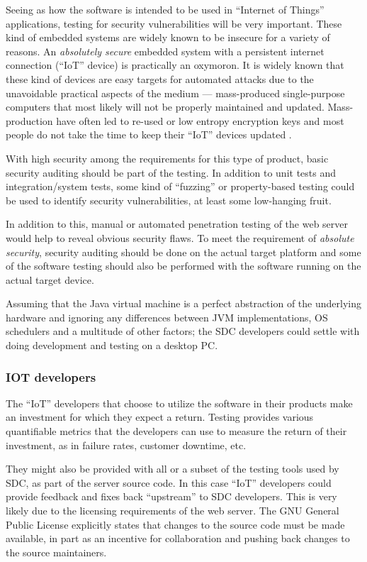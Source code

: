 Seeing as how the software is intended to be used in ``Internet of Things''
applications, testing for security vulnerabilities will be very important.
These kind of embedded systems are widely known to be insecure for a variety of
reasons. \cite{iot-malwarebytes}
An \emph{absolutely secure} embedded system with a persistent internet
connection (``IoT'' device) is practically an oxymoron. It is widely known that
these kind of devices are easy targets for automated attacks due to the
unavoidable practical aspects of the medium --- mass-produced single-purpose
computers that most likely will not be properly maintained and updated.
Mass-production have often led to re-used or low entropy encryption keys
\cite{iot-crypto-key-reuse} and most people do not take the time to keep their
``IoT'' devices updated \cite{iot-attack-waiting-to-happen}.

With high security among the requirements for this type of product, basic
security auditing should be part of the testing.
In addition to unit tests and integration/system tests, some kind of
``fuzzing'' or property-based testing \cite{hypothesis-testing} could be used
to identify security vulnerabilities, at least some low-hanging fruit.

In addition to this, manual or automated penetration testing of the web server
would help to reveal obvious security flaws.
To meet the requirement of \emph{absolute security}, security auditing should
be done on the actual target platform and some of the software testing should
also be performed with the software running on the actual target
device\cite{6006307}.

Assuming that the Java virtual machine is a perfect abstraction of the
underlying hardware and ignoring any differences between JVM implementations,
OS schedulers and a multitude of other factors; the SDC developers could settle
with doing development and testing on a desktop PC.


\subsubsection{IOT developers}
The ``IoT'' developers that choose to utilize the software in their products
make an investment for which they expect a return. Testing provides various
quantifiable metrics that the developers can use to measure the return of their
investment, as in failure rates, customer downtime, etc.

They might also be provided with all or a subset of the testing tools used by
SDC, as part of the server source code. In this case ``IoT'' developers could 
provide feedback and fixes back ``upstream'' to SDC developers. This is very
likely due to the licensing requirements of the web server. The GNU General
Public License \cite{gplv2} explicitly states that changes to the source code
must be made available, in part as an incentive for collaboration and pushing
back changes to the source maintainers.


